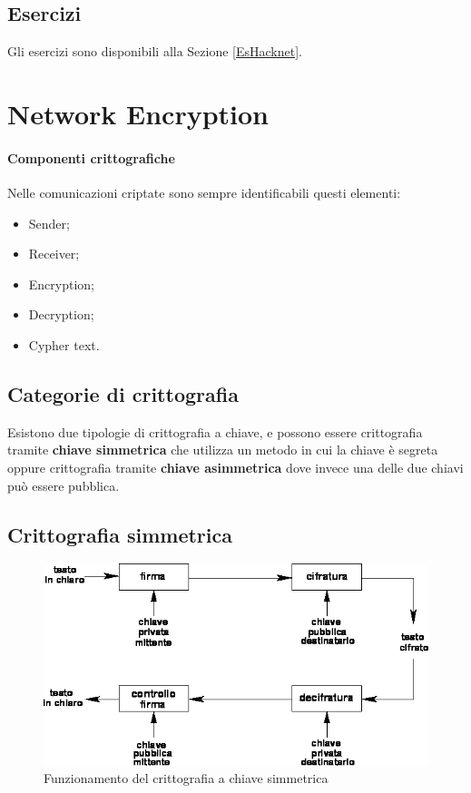 \subsection{Esercizi}

Gli esercizi sono disponibili alla Sezione \ref{EsHacknet}.


\section{Network Encryption}

\paragraph*{Componenti crittografiche}
Nelle comunicazioni criptate sono sempre identificabili questi elementi:
\begin{itemize}
\item Sender;
\item Receiver;
\item Encryption;
\item Decryption;
\item Cypher text.
\end{itemize}

\subsection{Categorie di crittografia}

Esistono due tipologie di crittografia a chiave, e possono essere crittografia
tramite \textbf{chiave simmetrica} che utilizza un metodo in cui la chiave è
segreta oppure crittografia tramite \textbf{chiave asimmetrica} dove invece una
delle due chiavi può essere pubblica.

\subsection{Crittografia simmetrica}

\begin{figure}[H]
\centering
\includegraphics[scale=0.4]{res/img/symmetric.png}
\caption{Funzionamento del crittografia a chiave simmetrica}
\label{fig:password:symmetric}
\end{figure}

